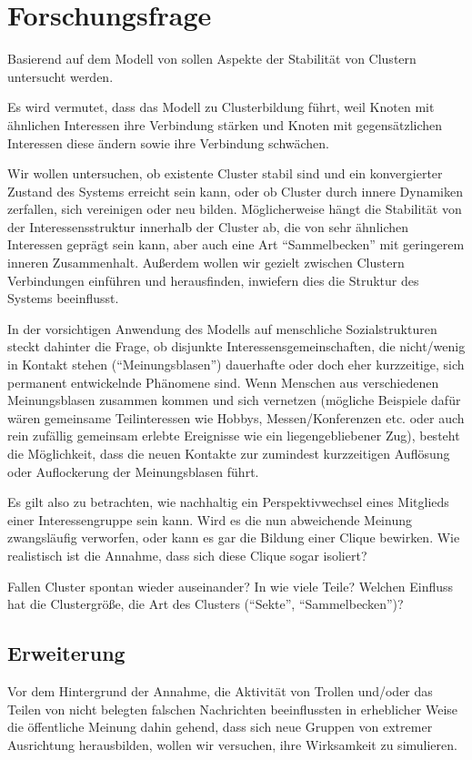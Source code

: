 \documentclass[11pt, a4paper]{scrartcl}
\begin{document}
\section{Forschungsfrage}

Basierend auf dem Modell von \autocite{Koehler-Bussmeier2018} sollen Aspekte der Stabilität von Clustern untersucht werden.

Es wird vermutet, dass das Modell zu Clusterbildung führt, weil Knoten mit ähnlichen Interessen ihre Verbindung stärken und Knoten mit gegensätzlichen Interessen diese ändern sowie ihre Verbindung schwächen.

Wir wollen untersuchen, ob existente Cluster stabil sind und ein konvergierter Zustand des Systems erreicht sein kann, oder ob Cluster durch innere Dynamiken zerfallen, sich vereinigen oder neu bilden. Möglicherweise hängt die Stabilität von der Interessensstruktur innerhalb der Cluster ab, die von sehr ähnlichen Interessen geprägt sein kann, aber auch eine Art "`Sammelbecken"' mit geringerem inneren Zusammenhalt. Außerdem wollen wir gezielt zwischen Clustern Verbindungen einführen und herausfinden, inwiefern dies die Struktur des Systems beeinflusst.

In der vorsichtigen Anwendung des Modells auf menschliche Sozialstrukturen steckt dahinter die Frage, ob disjunkte Interessensgemeinschaften, die nicht/wenig in Kontakt stehen ("`Meinungsblasen"') dauerhafte oder doch eher kurzzeitige, sich permanent entwickelnde Phänomene sind. Wenn Menschen aus verschiedenen Meinungsblasen zusammen kommen und sich vernetzen (mögliche Beispiele dafür wären gemeinsame Teilinteressen wie Hobbys, Messen/Konferenzen etc. oder auch rein zufällig gemeinsam erlebte Ereignisse wie ein liegengebliebener Zug), besteht die Möglichkeit, dass die neuen Kontakte zur zumindest kurzzeitigen Auflösung oder Auflockerung der Meinungsblasen führt.

Es gilt also zu betrachten, wie nachhaltig ein Perspektivwechsel eines Mitglieds einer Interessengruppe sein kann. Wird es die nun abweichende Meinung zwangsläufig verworfen, oder kann es gar die Bildung einer Clique bewirken. Wie realistisch ist die Annahme, dass sich diese Clique sogar isoliert?

Fallen Cluster spontan wieder auseinander? In wie viele Teile? Welchen Einfluss hat die Clustergröße, die Art des Clusters ("`Sekte"', "`Sammelbecken"')?

\subsection{Erweiterung}
Vor dem Hintergrund der Annahme, die Aktivität von Trollen und/oder das Teilen von nicht belegten falschen Nachrichten beeinflussten in erheblicher Weise die öffentliche Meinung dahin gehend, dass sich neue Gruppen von  extremer Ausrichtung herausbilden, wollen wir versuchen, ihre Wirksamkeit zu simulieren.
\end{document}
